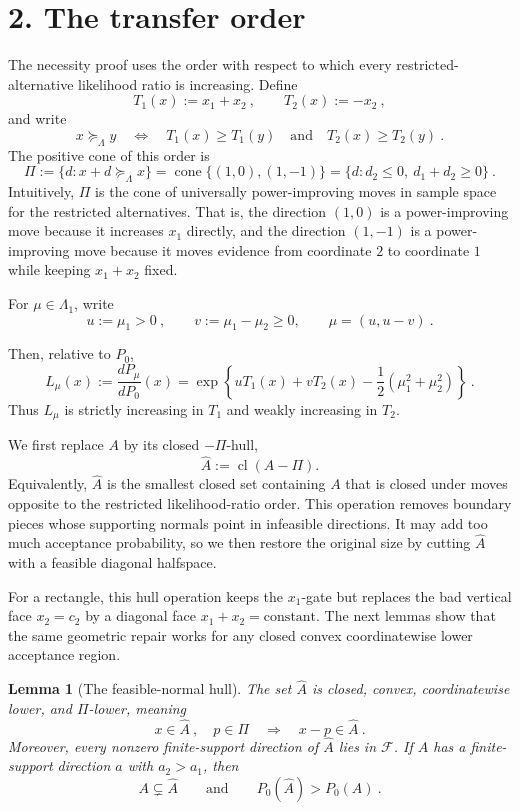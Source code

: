 \documentclass[12pt]{article}
\newtheorem{lemma}{Lemma}
\theoremstyle{remark}
\begin{document}
\section*{2. The transfer order}

The necessity proof uses the order with respect to which every restricted-alternative likelihood ratio is increasing.  Define
\[
T_1(x):=x_1+x_2~,
\qquad
T_2(x):=-x_2~,
\]
and write
\[
x\succeq_\Lambda y
\quad\Longleftrightarrow\quad
T_1(x)\ge T_1(y)
\quad\text{and}\quad
T_2(x)\ge T_2(y)~.
\]
The positive cone of this order is
\[
\Pi:=\{d:x+d\succeq_\Lambda x\}
  =\operatorname{cone}\{(1,0),(1,-1)\}
  =\{d:d_2\le0,\ d_1+d_2\ge0\}~.
\]
Intuitively, $\Pi$ is the cone of universally power-improving moves in sample space for the restricted alternatives. That is, the direction $(1,0)$ is a power-improving move because it increases $x_1$ directly, and the direction $(1,-1)$ is a power-improving move because it moves evidence from coordinate $2$ to coordinate $1$ while keeping $x_1+x_2$ fixed.

For $\mu\in\Lambda_1$, write
\[ u:=\mu_1>0~,
\qquad
v:=\mu_1-\mu_2\ge0, \qquad 
\mu=(u,u-v)~.
\]

Then, relative to $P_0$,
\begin{equation}\label{eq:LR-density}
L_\mu(x):=\frac{dP_\mu}{dP_0}(x)
=
\exp\left\{uT_1(x)+vT_2(x)-\frac12(\mu_1^2+\mu_2^2)\right\}~.
\end{equation}
Thus $L_\mu$ is strictly increasing in $T_1$ and weakly increasing in $T_2$.

We first replace \(A\) by its closed \(-\Pi\)-hull,
\[
\widehat A:=\operatorname{cl}(A-\Pi).
\]
Equivalently, \(\widehat A\) is the smallest closed set containing \(A\) that is closed under moves opposite to the restricted likelihood-ratio order.  This operation removes boundary pieces whose supporting normals point in infeasible directions.  It may add too much acceptance probability, so we then restore the original size by cutting \(\widehat A\) with a feasible diagonal halfspace.

For a rectangle, this hull operation keeps the \(x_1\)-gate but replaces the bad vertical face \(x_2=c_2\) by a diagonal face \(x_1+x_2=\text{constant}\).  The next lemmas show that the same geometric repair works for any closed convex coordinatewise lower acceptance region.



\begin{lemma}[The feasible-normal hull]\label{lem:hull}
The set $\widehat A$ is closed, convex, coordinatewise lower, and $\Pi$-lower, meaning
\[
x\in\widehat A~,
\quad p\in\Pi
\quad\Longrightarrow\quad
x-p\in\widehat A~.
\]
Moreover, every nonzero finite-support direction of $\widehat A$ lies in $\mathcal F$.  If $A$ has a finite-support direction $a$ with $a_2>a_1$, then
\[
A\subsetneq \widehat A
\qquad\text{and}\qquad
P_0(\widehat A)>P_0(A)~.
\]
\end{lemma}
\end{document}
